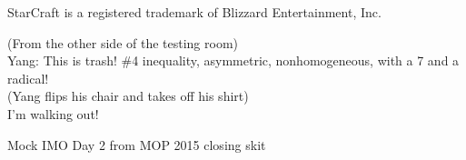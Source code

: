 \documentclass[11pt]{article}
\begin{document}
\epigraph{StarCraft is a registered trademark of Blizzard Entertainment, Inc.}{}

\pagebreak

\epigraph{(From the other side of the testing room) \\
Yang: This is trash! \#4 inequality, asymmetric, nonhomogeneous,
with a 7 and a radical! \\
(Yang flips his chair and takes off his shirt) \\
I'm walking out!}
{Mock IMO Day 2 from MOP 2015 closing skit}

\end{document}
